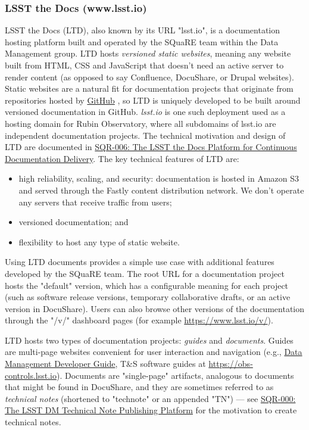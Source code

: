 \subsubsection{LSST the Docs (www.lsst.io)}

LSST the Docs (LTD), also known by its URL "lsst.io", is a documentation hosting platform built and operated by the SQuaRE team within the Data Management group.
LTD hosts \emph{versioned static websites}, meaning any website built from HTML, CSS and JavaScript that doesn't need an active server to render content (as opposed to say Confluence, DocuShare, or Drupal websites).
Static websites are a natural fit for documentation projects that originate from repositories hosted by \href{https://www.github.com}{GitHub} \citep{GitHub-cite}, so LTD is uniquely developed to be built around versioned documentation in GitHub.
\emph{lsst.io} is one such deployment used as a hosting domain for Rubin Observatory, where all subdomains of lsst.io are independent documentation projects.
The technical motivation and design of LTD are documented in \href{https://sqr-006.lsst.io}{SQR-006: The LSST the Docs Platform for Continuous Documentation Delivery}. 
The key technical features of LTD are:

\begin{itemize}
	\item high reliability, scaling, and security: documentation is hosted in Amazon S3 and served through the Fastly content distribution network.
	We don't operate any servers that receive traffic from users;
	\item versioned documentation; and
	\item flexibility to host any type of static website.
\end{itemize}

Using LTD documents provides a simple use case with additional features developed by the SQuaRE team.
The root URL for a documentation project hosts the "default" version, which has a configurable meaning for each project (such as software release versions, temporary collaborative drafts, or an active version in DocuShare).
Users can also browse other versions of the documentation through the "/v/" dashboard pages (for example \url{https://www.lsst.io/v/}).

LTD hosts two types of documentation projects: \emph{guides} and \emph{documents}.
Guides are multi-page websites convenient for user interaction and navigation (e.g., \href{developer.lsst.io}{Data Management Developer Guide}, T\&S software guides at \url{https://obs-controls.lsst.io}).
Documents are "single-page" artifacts, analogous to documents that might be found in DocuShare, and they are sometimes referred to as \emph{technical notes} (shortened to "technote" or an appended "TN") --- see \href{https://sqr-000.lsst.io}{SQR-000: The LSST DM Technical Note Publishing Platform} for the motivation to create technical notes. 

